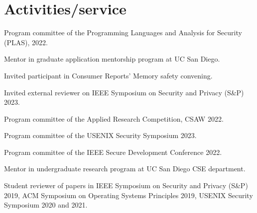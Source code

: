 \section{Activities/service}

{ Program committee of the Programming Languages and Analysis for Security (PLAS), 2022. }

{ Mentor in 
graduate application mentorship program at UC San Diego. }

{ Invited participant in Consumer Reports' Memory safety convening. }

{ Invited external reviewer on IEEE Symposium on Security and Privacy (S\&P) 2023.}

{ Program committee of the Applied Research Competition, CSAW 2022. }

{ Program committee of the USENIX Security Symposium 2023. }

{ Program committee of the IEEE Secure Development Conference 2022. }

{ Mentor in  undergraduate research program at UC San Diego CSE department. }

{ Student reviewer of papers in IEEE Symposium on Security and Privacy (S\&P)
2019, ACM Symposium on Operating Systems Principles 2019, USENIX Security
Symposium 2020 and 2021. }
